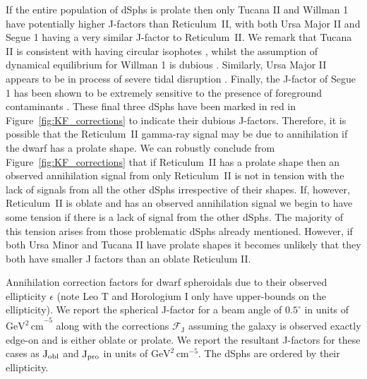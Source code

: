 \documentclass[prd,twocolumn,showpacs,preprintnumbers,superscriptaddress,nofootinbib,amsmath,amssymb,nobalancelastpage]{revtex4}
\newcommand{\Jf}{{\rm J}}
\begin{document}
If the entire population of dSphs is prolate then only Tucana II and
Willman 1 have potentially higher J-factors than Reticulum~II, with
both Ursa Major II and Segue 1 having a very similar J-factor to
Reticulum~II. We remark that Tucana II is consistent with having
circular isophotes \cite{Ko15}, whilst the assumption of dynamical
equilibrium for Willman 1 is dubious \cite{Willman2011}. Similarly, Ursa Major II appears
to be in process of severe tidal disruption \citep{Zu06}. Finally, the
J-factor of Segue 1 has been shown to be extremely sensitive to the presence of foreground
contaminants \citep[e.g.,][]{NO09,Bo15c}. These final three dSphs have been marked in red in Figure~\ref{fig:KF_corrections} to indicate their dubious J-factors. Therefore, it is possible that the Reticulum~II gamma-ray signal may be due to annihilation if the dwarf has a prolate shape. We can robustly conclude from Figure~\ref{fig:KF_corrections} that if Reticulum~II has a prolate shape then an observed annihilation signal from only Reticulum~II is not in tension with the lack of signals from all the other dSphs irrespective of their shapes. If, however, Reticulum~II is oblate and has an observed annihilation signal we begin to have some tension if there is a lack of signal from the other dSphs. The majority of this tension arises from those problematic dSphs already mentioned. However, if both Ursa Minor and Tucana II have prolate shapes it becomes unlikely that they both have smaller J factors than an oblate Reticulum II.

\begin{turnpage}
\begin{table}
\caption{Annihilation correction factors for dwarf spheroidals due to
  their observed ellipticity $\epsilon$ (note Leo T and Horologium I
  only have upper-bounds on the ellipticity). We report the spherical
  J-factor for a beam angle of $0.5^\circ$ in units of $\mathrm{GeV^2\,cm}^{-5}$ along with the corrections $\mathcal{F}_\mathrm{J}$
  assuming the galaxy is observed exactly edge-on and is either oblate
  or prolate. We report the resultant J-factors for these cases as
  $\Jf_\mathrm{obl}$ and $\Jf_\mathrm{pro}$ in units of
  $\mathrm{GeV^2\,cm^{-5}}$. The dSphs are ordered by their
  ellipticity.}
\begin{centering}

\end{centering}
\label{table:Jfs}
\end{table}
\end{turnpage}
\end{document}
